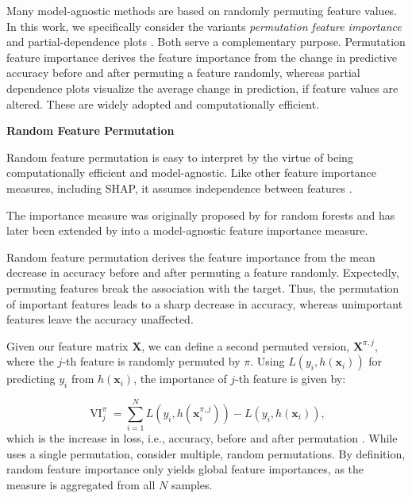 Many model-agnostic methods are based on randomly permuting feature values. In this work, we specifically consider the variants \emph{permutation feature importance} \autocite[][23--24]{breimanRandomForests2001} and partial-dependence plots \autocite[][26--28]{friedmanGreedyFunctionApproximation2001}. Both serve a complementary purpose. Permutation feature importance derives the feature importance from the change in predictive accuracy before and after permuting a feature randomly, whereas partial dependence plots visualize the average change in prediction, if feature values are altered. These are widely adopted and computationally efficient.

\textbf{Random Feature Permutation}

Random feature permutation is easy to interpret by the virtue of being computationally efficient and model-agnostic. Like other feature importance measures, including \gls{SHAP}, it assumes independence between features \autocite[][2]{aasExplainingIndividualPredictions2021}.

The importance measure was originally proposed by \textcite[][23--24]{breimanRandomForests2001} for random forests and has later been extended by \textcite[][??]{fisherAllModelsAre} into a model-agnostic feature importance measure.

Random feature permutation derives the feature importance from the mean decrease in accuracy before and after permuting a feature randomly. Expectedly, permuting features break the association with the target. Thus, the permutation of important features leads to a sharp decrease in accuracy, whereas unimportant features leave the accuracy unaffected.

Given our feature matrix $\mathbf{X}$, we can define a second permuted version, $\mathbf{X}^{\pi,j}$, where the $j$-th feature is randomly permuted by $\pi$. Using $L(y_i, h(\mathbf{x}_i))$ for predicting $y_i$ from $h(\mathbf{x}_{i})$, the importance of $j$-th feature is given by:

$$
    \operatorname{VI}^{\pi}_{j} = \sum_{i=1}^{N} L(y_{i}, h(\mathbf{x}_{i}^{\pi,j})) - L(y_{i}, h(\mathbf{x}_{i})),
$$
which is the increase in loss, i.e., accuracy, before and after permutation \textcite[][82]{hookerUnrestrictedPermutationForces2021}. While \textcite[][23--24]{breimanRandomForests2001} uses a single permutation, \textcite[][??]{fisherAllModelsAre} consider multiple, random permutations. By definition, random feature importance only yields global feature importances, as the measure is aggregated from all $N$ samples.

